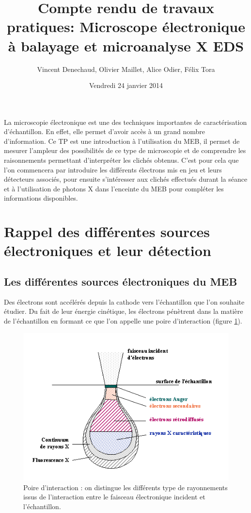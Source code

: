 \documentclass[a4paper,12pt]{article}
\title{Compte rendu de travaux pratiques: Microscope électronique à balayage et microanalyse X EDS}
\author{Vincent Denechaud, Olivier Maillet, Alice Odier, Félix Tora}
\date{Vendredi 24 janvier 2014}
\begin{document}
\maketitle

\tableofcontents



La microscopie électronique est une des techniques importantes de caractérisation d'échantillon. En effet, elle permet d'avoir accès à un grand nombre d'information. Ce TP est une introduction à l'utilisation du MEB, il permet de mesurer l'ampleur des possibilités de ce type de microscopie et de comprendre les raisonnements permettant d'interpréter les clichés obtenus. C'est pour cela que l'on commencera par introduire les différents électrons mis en jeu et leurs détecteurs associés, pour ensuite s'intéresser aux clichés effectués durant la séance et à l'utilisation de photons X dans l'enceinte du MEB pour compléter les informations disponibles.


\section{Rappel des différentes sources électroniques et leur détection}


\subsection{Les différentes sources électroniques du MEB}

Des électrons sont accélérés depuis la cathode vers l'échantillon que l'on souhaite étudier. Du fait de leur énergie cinétique, les électrons pénètrent dans la matière de l'échantillon en formant ce que l'on appelle une poire d'interaction (figure \ref{fig:poire_int}).

\begin{figure}
\centering
\includegraphics[width = 0.8 \textwidth]{images/poire_int.png}
\caption{Poire d'interaction : on distingue les différents type de rayonnements issus de l'interaction entre le faisceau électronique incident et l'échantillon.}
\label{fig:poire_int}
\end{figure}
\end{document}
